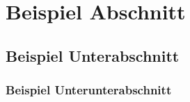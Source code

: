 \section{Beispiel Abschnitt}

\subsection{Beispiel Unterabschnitt}

\subsubsection{Beispiel Unterunterabschnitt}

\blindtext{}